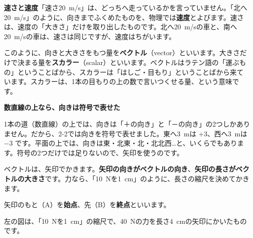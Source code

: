 \textbf{速さと速度}\quad 「速さ\qty{20}{m/s}」は、どっちへ走っているかを言っていません。「北へ\qty{20}{m/s}」のように、向きまでふくめたものを、物理では\textbf{速度}とよびます。速さは、速度の「大きさ」だけを取り出したものです。北へ\qty{20}{m/s}の車と、南へ\qty{20}{m/s}の車は、速さは同じですが、速度はちがいます。

このように、向きと大きさをもつ量を\textbf{ベクトル}（vector）といいます。大きさだけで決まる量を\textbf{スカラー}（scalar）といいます。ベクトルはラテン語の「運ぶもの」ということばから、スカラーは「はしご・目もり」ということばから来ています。スカラーは、1本の目もりの上の数で言いつくせる量、という意味です。

\begin{seikaku}
\textbf{数直線の上なら、向きは符号で表せた}\par
1本の道（数直線）の上では、向きは「＋の向き」と「－の向き」の2つしかありません。だから、2-2では向きを符号で表せました。東へ\qty{3}{m}は $+3$、西へ\qty{3}{m}は $-3$ です。平面の上では、向きは東・北東・北・北北西…と、いくらでもあります。符号の2つだけでは足りないので、矢印を使うのです。
\end{seikaku}


\label{bk:4-10:kigou}ベクトルは、矢印でかきます。\textbf{矢印の向きがベクトルの向き}、\textbf{矢印の長さがベクトルの大きさ}です。力なら、「\qty{10}{N}を\qty{1}{cm}」のように、長さの縮尺を決めてかきます。

\noindent\begin{minipage}[c]{0.48\linewidth}\centering
{}
\end{minipage}\hfill
\begin{minipage}[c]{0.49\linewidth}\raggedright 
矢印のもと（A）を\textbf{始点}、先（B）を\textbf{終点}といいます。\par\vspace{2pt}
左の図は、「\qty{10}{N}を\qty{1}{cm}」の縮尺で、\qty{40}{N}の力を長さ\qty{4}{cm}の矢印にかいたものです。
\end{minipage}


